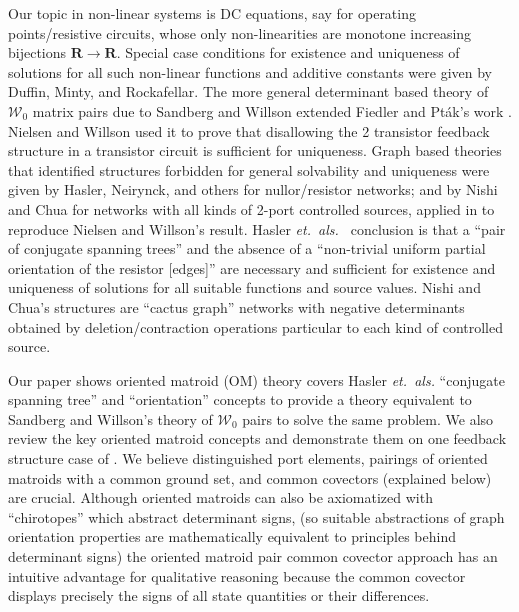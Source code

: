\documentclass{article}
\def\Reals{\ensuremath{\mathbf R}}
\begin{document}
Our topic in non-linear systems is DC equations, 
say for operating points/resistive circuits, whose only
non-linearities are 
monotone increasing bijections $\Reals\rightarrow\Reals$.  
Special case conditions
for existence and uniqueness of solutions for all 
such non-linear
functions and additive 
constants were given by Duffin, Minty,
and Rockafellar.  
The more general determinant based theory
of $\mathcal{W}_0$ matrix pairs due to Sandberg and Willson 
\cite{SWExistancePf} extended Fiedler and Pt\'{a}k's work \cite{FiedlerPtak}.
Nielsen and Willson \cite{NielWillpaper}
used it to prove 
that disallowing the 2 transistor feedback structure in a transistor circuit
is sufficient for uniqueness.
Graph based theories that identified structures forbidden for general
solvability and uniqueness were given by 
Hasler, Neirynck, and others \cite{HaslerDApplMath,HaslerNeirynck,Fosseprez}
for nullor/resistor networks; and by Nishi and Chua 
\cite{NishiChuaCactus,NishiChuaCCCS} for networks with all kinds of 2-port
controlled sources, applied in \cite{NishiChuaTransFB} to 
reproduce Nielsen and Willson's result.  
Hasler \textit{et.\ als.\ } conclusion is that 
a ``pair of conjugate spanning trees'' and the absence of a
``non-trivial uniform partial orientation of the resistor [edges]''
are necessary and sufficient for existence and uniqueness of solutions
for all suitable functions and source values.  Nishi and Chua's structures
are ``cactus graph'' networks with negative determinants obtained by 
deletion/contraction operations particular to each kind of controlled source.

Our paper shows 
oriented matroid (OM) theory \cite{BachemKern,OMBOOK}
covers
Hasler \textit{et.\ als.}
``conjugate spanning tree'' and ``orientation'' concepts to 
provide a theory equivalent to Sandberg and Willson's theory of 
$\mathcal{W}_0$ 
pairs 
to solve 
the same problem.  
We also review the key oriented matroid concepts and 
demonstrate them on one feedback structure case of
\cite{TrajWillNDR}.
We believe distinguished port elements,
pairings of oriented matroids with a common ground set,
and common covectors (explained below) are crucial.
Although oriented matroids can 
also be axiomatized with ``chirotopes''
which abstract determinant signs, 
(so suitable abstractions of graph orientation properties are
mathematically equivalent to principles behind determinant signs)
the oriented matroid pair
common covector approach has an intuitive
advantage for qualitative reasoning because
the common covector displays precisely 
the signs of all state quantities or their differences.
\end{document}
